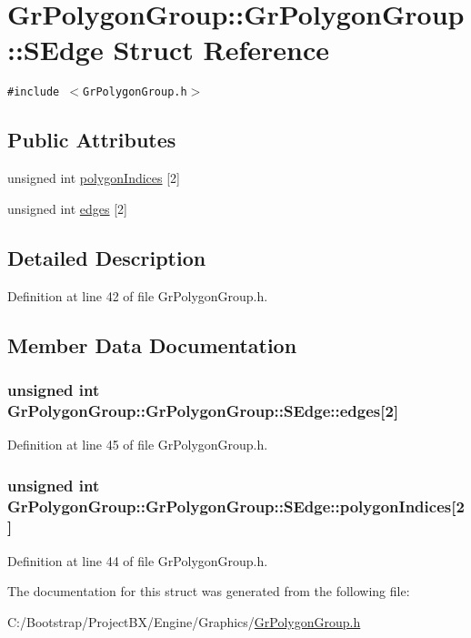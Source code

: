 \hypertarget{struct_gr_polygon_group_1_1_s_edge}{
\section{GrPolygonGroup::GrPolygonGroup::SEdge Struct Reference}
\label{struct_gr_polygon_group_1_1_s_edge}
}
{\tt \#include $<$GrPolygonGroup.h$>$}

\subsection*{Public Attributes}
\begin{CompactItemize}
\item 
unsigned int \hyperlink{struct_gr_polygon_group_1_1_s_edge_e3f83451acdd35d449949fcd3ceb6955}{polygonIndices} \mbox{[}2\mbox{]}
\item 
unsigned int \hyperlink{struct_gr_polygon_group_1_1_s_edge_cef6b20f41b849099e05a158e3a6b730}{edges} \mbox{[}2\mbox{]}
\end{CompactItemize}


\subsection{Detailed Description}


Definition at line 42 of file GrPolygonGroup.h.

\subsection{Member Data Documentation}
\hypertarget{struct_gr_polygon_group_1_1_s_edge_cef6b20f41b849099e05a158e3a6b730}{
\subsubsection[{edges}]{\setlength{\rightskip}{0pt plus 5cm}unsigned int GrPolygonGroup::GrPolygonGroup::SEdge::edges\mbox{[}2\mbox{]}}}
\label{struct_gr_polygon_group_1_1_s_edge_cef6b20f41b849099e05a158e3a6b730}




Definition at line 45 of file GrPolygonGroup.h.\hypertarget{struct_gr_polygon_group_1_1_s_edge_e3f83451acdd35d449949fcd3ceb6955}{
\subsubsection[{polygonIndices}]{\setlength{\rightskip}{0pt plus 5cm}unsigned int GrPolygonGroup::GrPolygonGroup::SEdge::polygonIndices\mbox{[}2\mbox{]}}}
\label{struct_gr_polygon_group_1_1_s_edge_e3f83451acdd35d449949fcd3ceb6955}




Definition at line 44 of file GrPolygonGroup.h.

The documentation for this struct was generated from the following file:\begin{CompactItemize}
\item 
C:/Bootstrap/ProjectBX/Engine/Graphics/\hyperlink{_gr_polygon_group_8h}{GrPolygonGroup.h}\end{CompactItemize}
